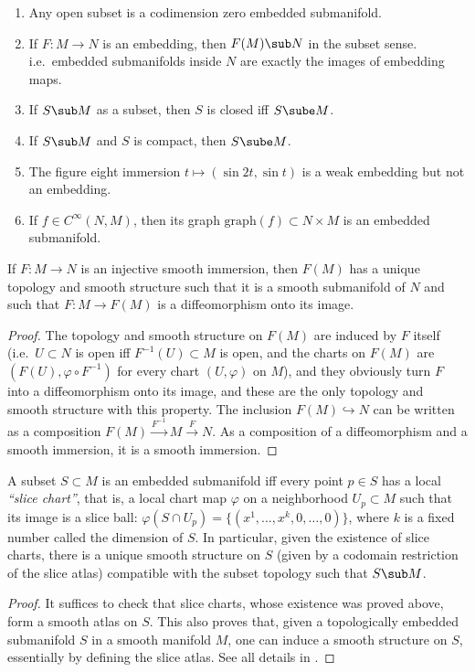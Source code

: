 \begin{example}\label{example submanifolds}
\begin{enumerate}
    \item Any open subset is a codimension zero embedded submanifold.
    \item If $F:M\to N$ is an embedding, then $F(M)\sub N$ in the subset sense. i.e.\ embedded submanifolds inside $N$ are exactly the images of embedding maps.
    \item If $S\sub M$ as a subset, then $S$ is closed iff $S\sube M$.
    \item If $S\sub M$ and $S$ is compact, then $S\sube M$.
    \item  The figure eight immersion $t\mapsto (\sin 2t,\sin t)$ is a weak embedding but not an embedding.
    \item If $f\in C^\infty(N,M)$, then its graph $\mathrm{graph}(f)\subset N\times M$ is an embedded submanifold.
\end{enumerate}
\end{example}


\begin{prop}\label{prop 5.18 Lee}
    If $F:M\to N$ is an injective smooth immersion, then $F(M)$ has a unique topology and smooth structure such that it is a smooth submanifold of $N$ and such that $F:M\to F(M)$ is a diffeomorphism onto its image.
\end{prop}
\begin{proof}
    The topology and smooth structure on $F(M)$ are induced by $F$ itself (i.e.~$U\subset N$ is open iff $F^{-1}(U)\subset M$ is open, and the charts on $F(M)$ are $(F(U),\varphi\circ F^{-1})$ for every chart $(U,\varphi)$ on $M$), and they obviously turn $F$ into a diffeomorphism onto its image, and these are the only topology and smooth structure with this property. The inclusion $F(M)\hookrightarrow N$ can be written as a composition $F(M)\overset{F^{-1}}{\to}M\overset{F}{\to}N$. As a composition of a diffeomorphism and a smooth immersion, it is a smooth immersion.
\end{proof}


\begin{prop}
A subset $S\subset M$ is an embedded submanifold iff every point $p\in S$ has a local \emph{``slice chart''}, that is, a local chart map $\varphi$ on a neighborhood $U_p\subset M$  such that its image is a slice ball: $\varphi(S\cap U_p)=\{(x^1,\ldots,x^k,0,\ldots,0)\}$, where $k$ is a fixed number called the dimension of $S$. In particular, given the existence of slice charts, there is a unique smooth structure on $S$ (given by a codomain restriction of the slice atlas) compatible with the subset topology such that $S\sub M$.
\end{prop}
\begin{proof}
It suffices to check that slice charts, whose existence was proved above, form a smooth atlas on $S$. This also proves that, given a topologically embedded submanifold $S$ in a smooth manifold $M$, one can induce a smooth structure on $S$, essentially by defining the slice atlas. See all details in \cite[Thm 5.8]{Lee}. 
\end{proof}


